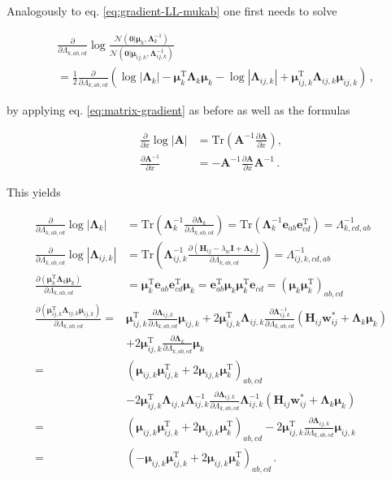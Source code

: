 \documentclass[11pt,a4paper,twoside]{book}
\newcommand{\Gauss}{\mathcal{N}}
\renewcommand{\H}{\mathbf{H}}
\newcommand{\Hij}{\H_{ij}}
\newcommand{\I}{\mathbf{I}}
\newcommand{\Lijk}{\mathbf{\Lambda}_{ij,k}}
\newcommand{\Lk}{\mathbf{\Lambda}_k}
\newcommand{\muijk}{\mathbf{\mu}_{ij,k}}
\newcommand{\muk}{\mathbf{\mu}_k}
\newcommand{\wij}{\mathbf{w}_{ij}}
\theoremstyle{definition}
\theoremstyle{definition}
\theoremstyle{remark}
\begin{document}
Analogously to eq. \eqref{eq:gradient-LL-mukab} one first needs to solve

\begin{align}
     & \frac{\partial}{\partial \Lambda_{k,ab,cd}} \log \frac{\Gauss( \mathbf{0} | \muk, \Lk^{-1})}{\Gauss( \mathbf{0} | \muijk, \Lijk^{-1})} \nonumber\\
     &= \frac{1}{2}  \frac{\partial}{\partial \Lambda_{k,ab,cd}}  \left( \log |\Lk| - \muk^\mathrm{T} \Lk \muk - \log |\Lijk| + \muijk^\mathrm{T} \Lijk \muijk \right) \,,
\label{eq:grad-log-N-N-lambdakabcd}
\end{align}

by applying eq. \eqref{eq:matrix-gradient} as before as well as the
formulas

\begin{align}
    \frac{\partial}{\partial x} \log |\mathbf{A} | &= \text{Tr}\left( \mathbf{A}^{-1} \frac{\partial \mathbf{A}}{\partial x}  \right) , \nonumber\\
    \frac{\partial \mathbf{A}^{-1}}{\partial x} &= - \mathbf{A}^{-1} \frac{\partial \mathbf{A}}{\partial x} \mathbf{A}^{-1} \,.
\end{align}

This yields

\begin{align}
\frac{\partial}{\partial \Lambda_{k,ab,cd}}  \log |\Lk|
     &= \text{Tr} \left( \Lk^{-1} \frac{\partial \Lk}{\partial \Lambda_{k,ab,cd}} \right) 
     = \text{Tr} \left( \Lk^{-1} \mathbf{e}_{ab} \mathbf{e}_{cd}^\mathrm{T} \right) 
     = \Lambda^{-1}_{k,cd,ab} \\
\frac{\partial}{\partial \Lambda_{k,ab,cd}}  \log |\Lijk|
     &= \text{Tr} \left( \Lijk^{-1} \frac{\partial (\H_{ij} - \lambda_w \I + \Lk)}{\partial \Lambda_{k,ab,cd}}   \right) 
     = \Lambda^{-1}_{ij,k,cd,ab} \\
\frac{\partial (\muk^\mathrm{T} \Lk \muk)}{\partial \Lambda_{k,ab,cd}} 
    &= \muk^\mathrm{T} \mathbf{e}_{ab} \mathbf{e}_{cd}^\mathrm{T} \muk 
    = \mathbf{e}_{ab}^\mathrm{T} \muk \muk^\mathrm{T} \mathbf{e}_{cd} = (\muk \muk^\mathrm{T})_{ab,cd} \\
\frac{\partial ( \muijk^\mathrm{T} \Lijk \muijk) }{\partial \Lambda_{k,ab,cd}} 
    =& \muijk^\mathrm{T} \frac{\partial \Lijk}{\partial \Lambda_{k,ab,cd}} \muijk 
    + 2 \muijk^\mathrm{T} \Lijk \frac{\partial \Lijk^{-1}}{\partial \Lambda_{k,ab,cd}}  (\Hij \wij^* + \Lk \muk) \nonumber\\
    &+ 2 \muijk^\mathrm{T} \frac{\partial \Lk}{\partial \Lambda_{k,ab,cd}} \muk \nonumber \\
    =& (\muijk \muijk^\mathrm{T} + 2 \muijk \muk^\mathrm{T})_{ab,cd} \nonumber \\
    & -2 \muijk^\mathrm{T} \Lijk  \Lijk^{-1} \frac{\partial \Lijk}{\partial \Lambda_{k,ab,cd}} \Lijk^{-1} (\Hij\wij^* + \Lk \muk) \nonumber \\
    =& (\muijk \muijk^\mathrm{T} + 2 \muijk \muk^\mathrm{T})_{ab,cd}  
    - 2 \muijk^\mathrm{T}  \frac{\partial \Lijk}{\partial \Lambda_{k,ab,cd}} \muijk \nonumber\\
    =& (- \muijk \muijk^\mathrm{T} + 2 \muijk \muk^\mathrm{T})_{ab,cd} \,.
\end{align}
\end{document}
